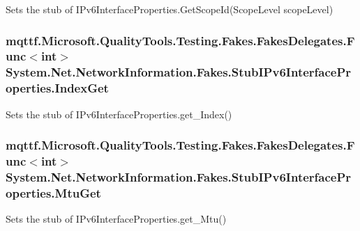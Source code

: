 Sets the stub of I\-Pv6\-Interface\-Properties.\-Get\-Scope\-Id(\-Scope\-Level scope\-Level)

\hypertarget{class_system_1_1_net_1_1_network_information_1_1_fakes_1_1_stub_i_pv6_interface_properties_ad58d56e1eab47866144d57d93084b2d1}{
\subsubsection[{Index\-Get}]{\setlength{\rightskip}{0pt plus 5cm}mqttf.\-Microsoft.\-Quality\-Tools.\-Testing.\-Fakes.\-Fakes\-Delegates.\-Func$<$int$>$ System.\-Net.\-Network\-Information.\-Fakes.\-Stub\-I\-Pv6\-Interface\-Properties.\-Index\-Get}}\label{class_system_1_1_net_1_1_network_information_1_1_fakes_1_1_stub_i_pv6_interface_properties_ad58d56e1eab47866144d57d93084b2d1}


Sets the stub of I\-Pv6\-Interface\-Properties.\-get\-\_\-\-Index()

\hypertarget{class_system_1_1_net_1_1_network_information_1_1_fakes_1_1_stub_i_pv6_interface_properties_ac2c9c25fbe8ce11301868fb1778db716}{
\subsubsection[{Mtu\-Get}]{\setlength{\rightskip}{0pt plus 5cm}mqttf.\-Microsoft.\-Quality\-Tools.\-Testing.\-Fakes.\-Fakes\-Delegates.\-Func$<$int$>$ System.\-Net.\-Network\-Information.\-Fakes.\-Stub\-I\-Pv6\-Interface\-Properties.\-Mtu\-Get}}\label{class_system_1_1_net_1_1_network_information_1_1_fakes_1_1_stub_i_pv6_interface_properties_ac2c9c25fbe8ce11301868fb1778db716}


Sets the stub of I\-Pv6\-Interface\-Properties.\-get\-\_\-\-Mtu()



